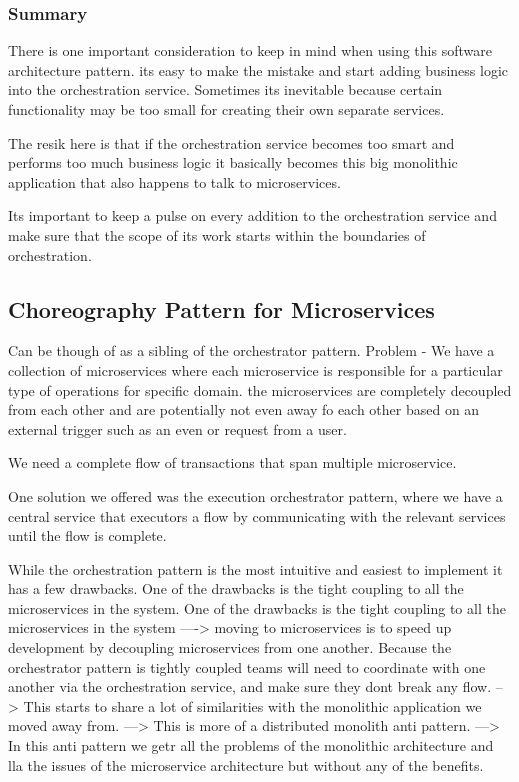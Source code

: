 \documentclass[a4paper, 11pt]{book}
\begin{document}
    \subsubsection{Summary}
    There is one important consideration to keep in mind when using this software architecture pattern.
    its easy to make the mistake and start adding business logic into the orchestration service.
    Sometimes its inevitable because certain functionality may be too small for creating their own separate services.

    The resik here is that if the orchestration service becomes too smart and performs too much business logic it basically becomes this big monolithic application that also happens to talk to microservices.

    Its important to keep a pulse on every addition to the orchestration service and make sure that the scope of its work starts within the boundaries of orchestration.

    \subsection{Choreography Pattern for Microservices}
    Can be though of as a sibling of the orchestrator pattern.
    Problem - We have a collection of microservices where each microservice is responsible for a particular type of operations for specific domain.
    the microservices are completely decoupled from each other and are potentially not even away fo each other based on an external trigger such as an even or request from a user.

    We need a complete flow of transactions that span multiple microservice.

    One solution we offered was the execution orchestrator pattern, where we have a central service that executors a flow by communicating with the relevant services until the flow is complete.

    While the orchestration pattern is the most intuitive and easiest to implement it has a few drawbacks.
    One of the drawbacks is the tight coupling to all the microservices in the system.
    One of the drawbacks is the tight coupling to all the microservices in the system
    ----> moving to microservices is to speed up development by decoupling microservices from one another.
    Because the orchestrator pattern is tightly coupled teams will need to coordinate with one another via the orchestration service, and make sure they dont break any flow.
    --> This starts to share a lot of similarities with the monolithic application we moved away from.
    ---> This is more of a distributed monolith anti pattern.
    ---> In this anti pattern we getr all the problems of the monolithic architecture and lla the issues of the microservice architecture but without any of the benefits.
\end{document}
